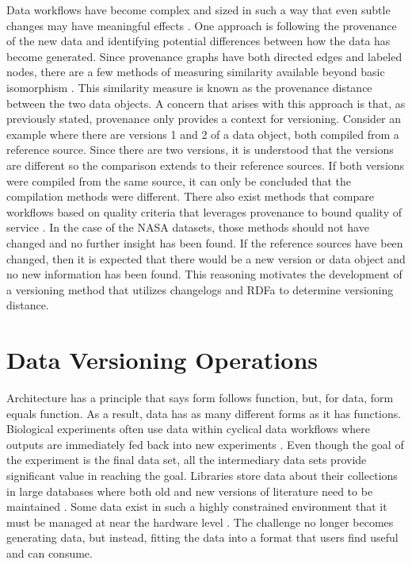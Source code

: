 Data workflows have become complex and sized in such a way that even subtle changes may have meaningful effects \cite{TILMES2011548}.
One approach is following the provenance of the new data and identifying potential differences between how the data has become generated.
Since provenance graphs have both directed edges and labeled nodes, there are a few methods of measuring similarity available beyond basic isomorphism \cite{Cao2013} \cite{Gao2010} \cite{Goddard:1996:DGU:246962.246972} .
This similarity measure is known as the provenance distance between the two data objects.
A concern that arises with this approach is that, as previously stated, provenance only provides a context for versioning.
Consider an example where there are versions 1 and 2 of a data object, both compiled from a reference source.
Since there are two versions, it is understood that the versions are different so the comparison extends to their reference sources.
If both versions were compiled from the same source, it can only be concluded that the compilation methods were different.
There also exist methods that compare workflows based on quality criteria that leverages provenance to bound quality of service \cite{2015:CAA:2778374.2778504}.
In the case of the NASA datasets, those methods should not have changed and no further insight has been found.
If the reference sources have been changed, then it is expected that there would be a new version or data object and no new information has been found.
This reasoning motivates the development of a versioning method that utilizes changelogs and RDFa to determine versioning distance.

\section{Data Versioning Operations}

Architecture has a principle that says form follows function, but, for data, form equals function.
As a result, data has as many different forms as it has functions.
Biological experiments often use data within cyclical data workflows where outputs are immediately fed back into new experiments \cite{Tagger2005}.
Even though the goal of the experiment is the final data set, all the intermediary data sets provide significant value in reaching the goal.
Libraries store data about their collections in large databases where both old and new versions of literature need to be maintained \cite{Wiil:2000:RDH:338407.338517}.
Some data exist in such a highly constrained environment that it must be managed at near the hardware level \cite{Flouris04clotho:transparent}.
The challenge no longer becomes generating data, but instead, fitting the data into a format that users find useful and can consume.

